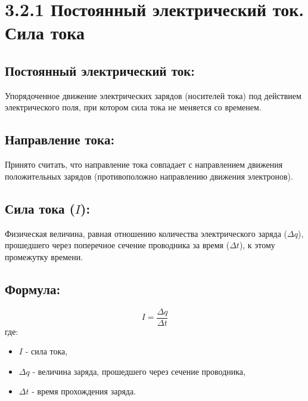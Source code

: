 \documentclass[a4paper,12pt]{article}
\begin{document}
\begin{center}
\end{center}

\vspace{-2.5em}

\section*{3.2.1 Постоянный электрический ток. Сила тока}
\vspace{-9pt}
\subsection*{Постоянный электрический ток:}
\vspace{-3pt}
Упорядоченное движение электрических зарядов (носителей тока) под действием электрического поля, при котором сила тока не меняется со временем.

\vspace{-9pt}
\subsection*{Направление тока:}
\vspace{-3pt}
Принято считать, что направление тока совпадает с направлением движения положительных зарядов (противоположно направлению движения электронов).

\vspace{-9pt}
\subsection*{Сила тока ($I$):}
\vspace{-3pt}
Физическая величина, равная отношению количества электрического заряда ($\Delta q$), прошедшего через поперечное сечение проводника за время ($\Delta t$), к этому промежутку времени.

\vspace{-9pt}
\subsection*{Формула:}
\vspace{-3pt}
\vspace{-0.05em}
$$ I = \frac{\Delta q}{\Delta t} $$
где:
\begin{itemize}
    \item $I$ - сила тока,
    \item $\Delta q$ - величина заряда, прошедшего через сечение проводника,
    \item $\Delta t$ - время прохождения заряда.
\end{itemize}
\end{document}
